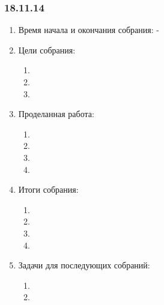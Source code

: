 \subsubsection{18.11.14}

\begin{enumerate}
	\item Время начала и окончания собрания:
	-
	\item Цели собрания:
	\begin{enumerate}
	  \item 
	  
	  \item 
	  
	  \item 
	  
    \end{enumerate}
	\item Проделанная работа:
	\begin{enumerate}
	  \item
      
      \item  
      
      \item  
      
      \item   
          
    \end{enumerate}
    
	\item Итоги собрания: 
	\begin{enumerate}
	  \item 
	  
      \item 
      
      \item 
      
      \item 
      
    \end{enumerate}
    
	\item Задачи для последующих собраний:
	\begin{enumerate}
	  \item 
	  
	  \item 

    \end{enumerate}     
\end{enumerate}
\fillpage